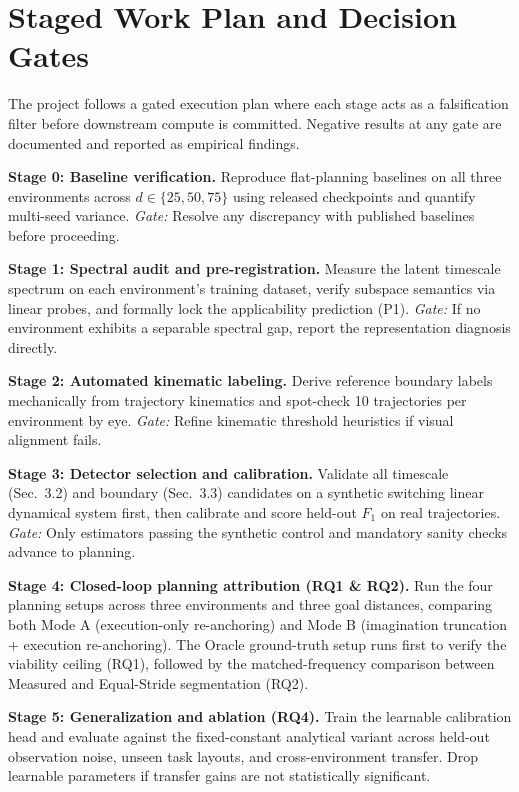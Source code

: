 \documentclass[11pt]{article}
\begin{document}
\section{Staged Work Plan and Decision Gates}

The project follows a gated execution plan where each stage acts as a falsification filter before downstream compute is committed. Negative results at any gate are documented and reported as empirical findings.

\textbf{Stage 0: Baseline verification.} Reproduce flat-planning baselines on all three environments across $d \in \{25, 50, 75\}$ using released checkpoints and quantify multi-seed variance. \textit{Gate:} Resolve any discrepancy with published baselines before proceeding.

\textbf{Stage 1: Spectral audit and pre-registration.} Measure the latent timescale spectrum on each environment's training dataset, verify subspace semantics via linear probes, and formally lock the applicability prediction (P1). \textit{Gate:} If no environment exhibits a separable spectral gap, report the representation diagnosis directly.

\textbf{Stage 2: Automated kinematic labeling.} Derive reference boundary labels mechanically from trajectory kinematics and spot-check 10 trajectories per environment by eye. \textit{Gate:} Refine kinematic threshold heuristics if visual alignment fails.

\textbf{Stage 3: Detector selection and calibration.} Validate all timescale (Sec.~3.2) and boundary (Sec.~3.3) candidates on a synthetic switching linear dynamical system first, then calibrate and score held-out $F_1$ on real trajectories. \textit{Gate:} Only estimators passing the synthetic control and mandatory sanity checks advance to planning.

\textbf{Stage 4: Closed-loop planning attribution (RQ1 \& RQ2).} Run the four planning setups across three environments and three goal distances, comparing both Mode A (execution-only re-anchoring) and Mode B (imagination truncation + execution re-anchoring). The Oracle ground-truth setup runs first to verify the viability ceiling (RQ1), followed by the matched-frequency comparison between Measured and Equal-Stride segmentation (RQ2).

\textbf{Stage 5: Generalization and ablation (RQ4).} Train the learnable calibration head and evaluate against the fixed-constant analytical variant across held-out observation noise, unseen task layouts, and cross-environment transfer. Drop learnable parameters if transfer gains are not statistically significant.
\end{document}
